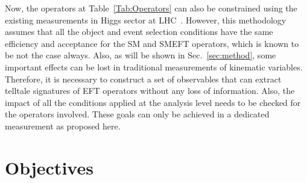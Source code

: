 \documentclass[a4paper,11pt]{article}
\begin{document}
Now, the operators at Table~\ref{Tab:Operators} can also be constrained using the existing measurements in Higgs sector at LHC~\cite{CMS-PAS-HIG-19-005,ATLAS:2020fcp,ATLAS:2020jwz}. 
However, this methodology assumes that all the object and event selection conditions have the same efficiency and acceptance for the SM and SMEFT operators, 
which is known to be not the case always. 
Also, as will be shown in Sec.~\ref{sec:method}, some important effects can be lost in traditional measurements of kinematic variables. 
Therefore, it is necessary to construct a set of observables that can extract telltale signatures of EFT operators without any loss of information. 
Also, the impact of all the conditions applied at the analysis level needs to be checked for the operators involved. 
These goals can only be achieved in a dedicated measurement as proposed here.

\section{Objectives}
\label{sec:objective}
\end{document}
